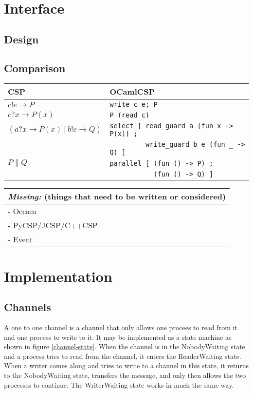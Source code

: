 \documentclass[11pt,oneside,a4paper]{article}
\newcommand{\missing}[1]{
\begin{tabular}{|p{11cm}|}
\hline
\emph{Missing:} {\scriptsize (things that need to be written or considered)} \\
\hline
#1
\hline
\end{tabular}
}
\begin{document}
\section{Interface}

\subsection{Design}

\subsection{Comparison}

\begin{tabular}{l|l}
CSP & OCamlCSP \\
\hline
$c!e \to P$ & \texttt{write c e; P} \\
\hline
$c?x \to P(x)$ & \texttt{P (read c)} \\
\hline
$(a?x \to P(x)\ |\ b!e \to Q)$ 
&\verb|select [ read_guard a (fun x -> P(x)) ;| \\
&\verb|         write_guard b e (fun _ -> Q) ]|\\
\hline
$P \parallel Q$ 
&\verb|parallel [ (fun () -> P) ;| \\
&\verb|           (fun () -> Q) ]| \\
\end{tabular}

\missing{
- Occam \\
- PyCSP/JCSP/C++CSP \\
- Event \\
}

\section{Implementation}

\subsection{Channels}
A one to one channel is a channel that only allows one procees to read from it and one process 
to write to it. It may be implemented as a state machine as shown in figure \ref{channel-state}.
When the channel is in the NobodyWaiting state and a process tries to read from the channel,
it enters the ReaderWaiting state. When a writer comes along and tries to write to a channel
in this state, it returns to the NobodyWaiting state, transfers the message, and only then
allows the two processes to continue. The WriterWaiting state works in much the same way.
\end{document}
